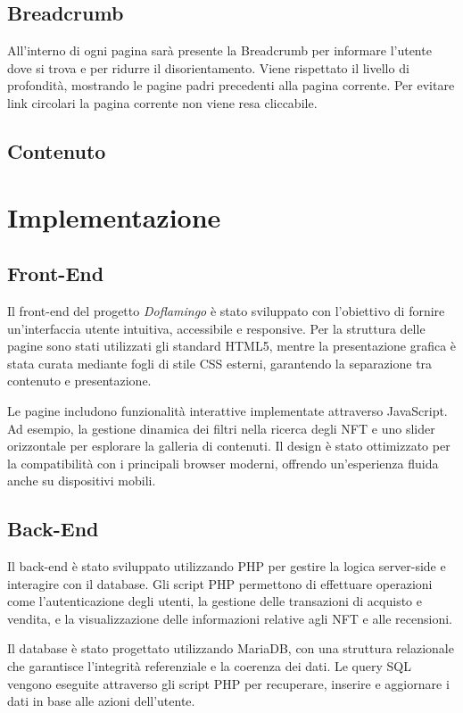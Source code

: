 \documentclass[10pt]{article}
\begin{document}
\subsection{Breadcrumb}
All'interno di ogni pagina sarà presente la Breadcrumb per informare l'utente dove si trova e per ridurre il disorientamento. Viene rispettato il livello di profondità, mostrando le pagine padri precedenti alla pagina corrente. Per evitare link circolari la pagina corrente non viene resa cliccabile.

\subsection{Contenuto}

\section{Implementazione}
\subsection{Front-End}
Il front-end del progetto \textit{Doflamingo} \`e stato sviluppato con l'obiettivo di fornire un'interfaccia utente intuitiva, accessibile e responsive. Per la struttura delle pagine sono stati utilizzati gli standard HTML5, mentre la presentazione grafica \`e stata curata mediante fogli di stile CSS esterni, garantendo la separazione tra contenuto e presentazione.

Le pagine includono funzionalit\`a interattive implementate attraverso JavaScript. Ad esempio, la gestione dinamica dei filtri nella ricerca degli NFT e uno slider orizzontale per esplorare la galleria di contenuti. Il design \`e stato ottimizzato per la compatibilit\`a con i principali browser moderni, offrendo un'esperienza fluida anche su dispositivi mobili.

\subsection{Back-End}
Il back-end \`e stato sviluppato utilizzando PHP per gestire la logica server-side e interagire con il database. Gli script PHP permettono di effettuare operazioni come l'autenticazione degli utenti, la gestione delle transazioni di acquisto e vendita, e la visualizzazione delle informazioni relative agli NFT e alle recensioni.

Il database \`e stato progettato utilizzando MariaDB, con una struttura relazionale che garantisce l'integrit\`a referenziale e la coerenza dei dati. Le query SQL vengono eseguite attraverso gli script PHP per recuperare, inserire e aggiornare i dati in base alle azioni dell'utente.
\end{document}
